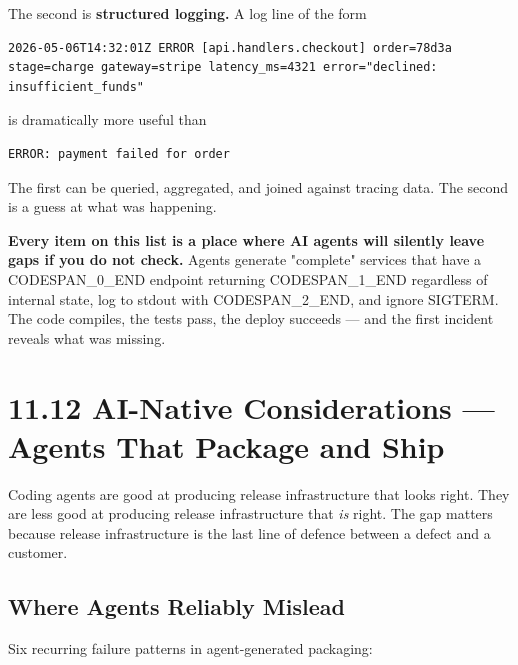 \documentclass[11pt,a4paper]{book}
\begin{document}
The second is \textbf{structured logging.} A log line of the form

\begin{lstlisting}
2026-05-06T14:32:01Z ERROR [api.handlers.checkout] order=78d3a stage=charge gateway=stripe latency_ms=4321 error="declined: insufficient_funds"
\end{lstlisting}

is dramatically more useful than

\begin{lstlisting}
ERROR: payment failed for order
\end{lstlisting}

The first can be queried, aggregated, and joined against tracing data. The second is a guess at what was happening.

\textbf{Every item on this list is a place where AI agents will silently leave gaps if you do not check.} Agents generate "complete" services that have a CODESPAN\_0\_END endpoint returning CODESPAN\_1\_END regardless of internal state, log to stdout with CODESPAN\_2\_END, and ignore SIGTERM. The code compiles, the tests pass, the deploy succeeds --- and the first incident reveals what was missing.

\medskip

\section{11.12 AI-Native Considerations --- Agents That Package and Ship}

Coding agents are good at producing release infrastructure that looks right. They are less good at producing release infrastructure that \textit{is} right. The gap matters because release infrastructure is the last line of defence between a defect and a customer.

\subsection{Where Agents Reliably Mislead}

Six recurring failure patterns in agent-generated packaging:
\end{document}
